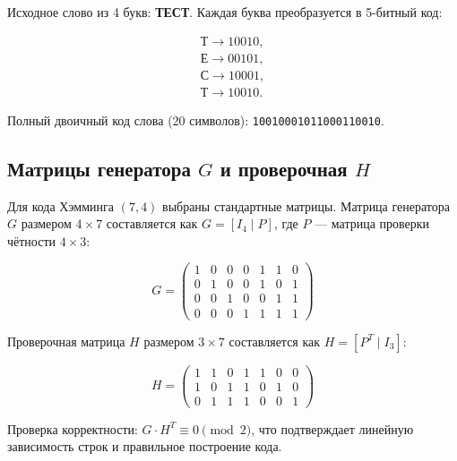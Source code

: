 Исходное слово из 4 букв: \textbf{ТЕСТ}. Каждая буква преобразуется в 5-битный код:

\begin{align}
    \text{Т} \rightarrow 10010, \\
    \text{Е} \rightarrow 00101, \\
    \text{С} \rightarrow 10001, \\
    \text{Т} \rightarrow 10010.
\end{align}

Полный двоичный код слова (20 символов): \texttt{10010001011000110010}.

\subsection{Матрицы генератора $G$ и проверочная $H$}
Для кода Хэмминга $(7, 4)$ выбраны стандартные матрицы. Матрица генератора $G$ размером $4 \times 7$ составляется как $G = [I_4 \;|\; P]$, где $P$ — матрица проверки чётности $4 \times 3$:

\[
G = \begin{pmatrix}
1 & 0 & 0 & 0 & 1 & 1 & 0 \\
0 & 1 & 0 & 0 & 1 & 0 & 1 \\
0 & 0 & 1 & 0 & 0 & 1 & 1 \\
0 & 0 & 0 & 1 & 1 & 1 & 1
\end{pmatrix}
\]

Проверочная матрица $H$ размером $3 \times 7$ составляется как $H = [P^T \;|\; I_3]$:

\[
H = \begin{pmatrix}
1 & 1 & 0 & 1 & 1 & 0 & 0 \\
1 & 0 & 1 & 1 & 0 & 1 & 0 \\
0 & 1 & 1 & 1 & 0 & 0 & 1
\end{pmatrix}
\]

Проверка корректности: $G \cdot H^T \equiv 0 \pmod{2}$, что подтверждает линейную зависимость строк и правильное построение кода.

\begin{center}
\end{center}

